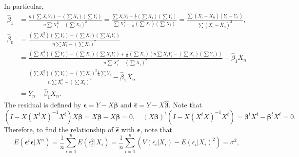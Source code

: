 In particular,
\begin{equation*}
    \begin{split}
        \hat{\beta}_1
            &= \frac{
                n \left(\sum X_i Y_i\right) - \left(\sum X_i\right)\left(\sum Y_i\right)
            }{
                n \sum X_i^2 - \left(\sum X_i\right)^2
            }
            = \frac{
                \sum X_i Y_i - \frac{1}{n}\left(\sum X_i\right)\left(\sum Y_i\right)
            }{
                \sum X_i^2 - \frac{1}{n}\left(\sum X_i\right)\left(\sum X_i\right)
            }
            = \frac{
                \sum (X_i - \overline{X}_n)(Y_i - \overline{Y}_n)
            }{
                \sum (X_i - \overline{X}_n)^2
            }, \\
        \hat{\beta}_0
            &= \frac{
                \left(\sum X_i^2\right)\left(\sum Y_i\right) - \left(\sum X_i\right)\left(\sum X_i Y_i\right)
            }{
                n \sum X_i^2 - \left(\sum X_i\right)^2
            } \\
            &= \frac{
                \left(\sum X_i^2\right)\left(\sum Y_i\right) - \left(\sum X_i\right)\left(\sum X_i Y_i\right)
                    + \frac{1}{n} (\sum X_i) (n \sum X_i Y_i - (\sum X_i) (\sum Y_i))
            }{
                n \sum X_i^2 - \left(\sum X_i\right)^2
            } - \hat{\beta}_1 \overline{X}_n \\
            &= \frac{
                \left(\sum X_i^2\right)\left(\sum Y_i\right)
                    - (\sum X_i)^2 \frac{1}{n} \sum Y_i
            }{
                n \sum X_i^2 - \left(\sum X_i\right)^2
            } - \hat{\beta}_1 \overline{X}_n \\
            &= \overline{Y}_n - \hat{\beta}_1 \overline{X}_n.
    \end{split}
\end{equation*}
The residual is defined by $\bm{\epsilon} = Y - X \bm{\beta}$ and $\hat{\bm{\epsilon}} = Y - X \hat{\bm{\beta}}$.
Note that
\begin{equation*}
    (I - X(X^tX)^{-1}X^t)X\bm{\beta} = X\bm{\beta} - X\bm{\beta} = 0, \quad
    (X\bm{\beta})^t(I - X(X^tX)^{-1}X^t) = \bm{\beta}^tX^t - \bm{\beta}^tX^t = 0.
\end{equation*}
Therefore, to find the relationship of $\hat{\bm{\epsilon}}$ with $\bm{\epsilon}$, note that
\begin{equation*}
    E(\bm{\epsilon}^t\bm{\epsilon}|X^n)
         = \frac{1}{n} \sum_{i = 1}^n E(\epsilon_i^2|X_i)
         = \frac{1}{n} \sum_{i = 1}^n (V(\epsilon_i|X_i) - E(\epsilon_i|X_i)^2)
         = \sigma^2,
\end{equation*}
